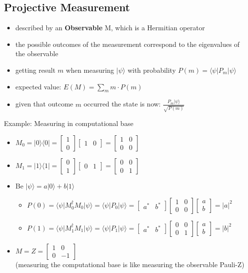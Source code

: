 \documentclass[12pt,a4paper]{article}
\newcommand{\ket}[1]{\vert #1 \rangle}
\newcommand{\tek}[1]{\langle #1 \vert}
\newcommand*\vv[2]{
    \begin{bmatrix}#1\\#2\end{bmatrix}
}
\begin{document}
\subsection{Projective Measurement}
\begin{itemize}
\item described by an \textbf{Observable} M, which is a Hermitian operator
\item the possible outcomes of the measurement correspond to the eigenvalues of the observable
\item getting result $m$ when measuring $\ket{\psi}$ with probability $P(m) = \tek{\psi}P_m\ket{\psi}$
\item expected value: $E(M) = \sum_m m\cdot P(m)$
\item given that outcome $m$ occurred the state is now: $\frac{P_m\ket{\psi}}{\sqrt{P(m)}}$
\end{itemize}
Example: Measuring in computational base
\begin{itemize}
\item $M_0 = \ket{0}\tek{0} = \vv{1}{0} \begin{bmatrix} 1 & 0 \end{bmatrix} = \begin{bmatrix} 1 & 0 \\ 0 & 0 \end{bmatrix}$
\item $M_1 = \ket{1}\tek{1} = \vv{0}{1} \begin{bmatrix} 0 & 1 \end{bmatrix} = \begin{bmatrix} 0 & 0 \\ 0 & 1 \end{bmatrix}$
\item Be $\ket{\psi} = a\ket{0}+b\ket{1}$
\begin{itemize}
\item $P(0) = \tek{\psi}M_0^\dagger M_0\ket{\psi} = \tek{\psi}P_0\ket{\psi} = \begin{bmatrix} a^* & b^* \end{bmatrix}\begin{bmatrix} 1 & 0 \\ 0 & 0 \end{bmatrix} \vv{a}{b} = \vert a \vert^2$
\item $P(1) = \tek{\psi}M_1^\dagger M_1\ket{\psi} = \tek{\psi}P_1\ket{\psi} = \begin{bmatrix} a^* & b^* \end{bmatrix}\begin{bmatrix} 0 & 0 \\ 0 & 1 \end{bmatrix} \vv{a}{b} = \vert b \vert^2$
\end{itemize}
\item $M = Z = \begin{bmatrix}1 & 0 \\ 0 & -1\end{bmatrix}$\\(measuring the computational base is like measuring the observable Pauli-Z)
\end{itemize}
\end{document}
